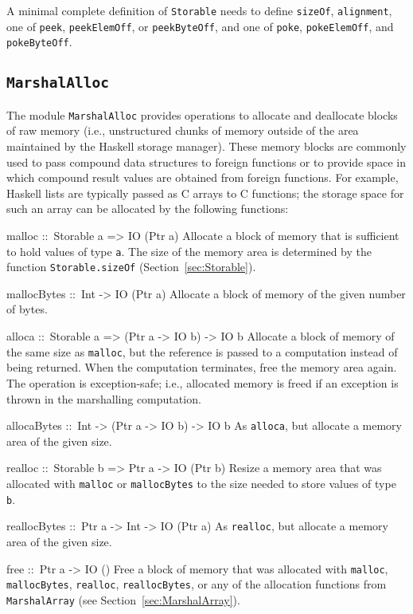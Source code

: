 \documentclass[a4paper,twoside]{article}
\makeatletter
\newcommand{\code}[1]{\texttt{#1}}      %
\newenvironment{codedesc}{%
  \list{}{\labelwidth\z@
    \let\makelabel\codedesclabel}
  }{%
  \endlist
  }
\newcommand*{\codedesclabel}[1]{%
  \hspace{-\leftmargin}
  \parbox[b]{\labelwidth}{\makebox[0pt][l]{\code{#1}}\\}\hfil\relax
  }
\makeatother
\begin{document}
A minimal complete definition of \code{Storable} needs to define
\code{sizeOf}, \code{alignment}, one of \code{peek}, \code{peekElemOff}, or
\code{peekByteOff}, and one of \code{poke}, \code{pokeElemOff}, and
\code{pokeByteOff}.

\subsection{\code{MarshalAlloc}}
\label{sec:MarshalAlloc}

The module \code{MarshalAlloc} provides operations to allocate and deallocate
blocks of raw memory (i.e., unstructured chunks of memory outside of the area
maintained by the Haskell storage manager).  These memory blocks are commonly
used to pass compound data structures to foreign functions or to provide space
in which compound result values are obtained from foreign functions.  For
example, Haskell lists are typically passed as C arrays to C functions; the
storage space for such an array can be allocated by the following functions:
%
\begin{codedesc}
\item[malloc ::\ Storable a => IO (Ptr a)] Allocate a block of memory that is
  sufficient to hold values of type \code{a}.  The size of the memory area is
  determined by the function \code{Storable.sizeOf}
  (Section~\ref{sec:Storable}).

\item[mallocBytes ::\ Int -> IO (Ptr a)] Allocate a block of memory of the
  given number of bytes.
  
\item[alloca ::\ Storable a => (Ptr a -> IO b) -> IO b] Allocate a block of
  memory of the same size as \code{malloc}, but the reference is passed to a
  computation instead of being returned.  When the computation terminates,
  free the memory area again.  The operation is exception-safe; i.e.,
  allocated memory is freed if an exception is thrown in the marshalling
  computation.

\item[allocaBytes ::\ Int -> (Ptr a -> IO b) -> IO b] As \code{alloca}, but
  allocate a memory area of the given size.
  
\item[realloc ::\ Storable b => Ptr a -> IO (Ptr b)] Resize a memory area that
  was allocated with \code{malloc} or \code{mallocBytes} to the size needed to
  store values of type \code{b}.
  
\item[reallocBytes ::\ Ptr a -> Int -> IO (Ptr a)] As \code{realloc}, but
  allocate a memory area of the given size.
  
\item[free ::\ Ptr a -> IO ()] Free a block of memory that was allocated with
  \code{malloc}, \code{mallocBytes}, \code{realloc}, \code{reallocBytes}, or
  any of the allocation functions from \code{MarshalArray} (see
  Section~\ref{sec:MarshalArray}).
\end{codedesc}
\end{document}
